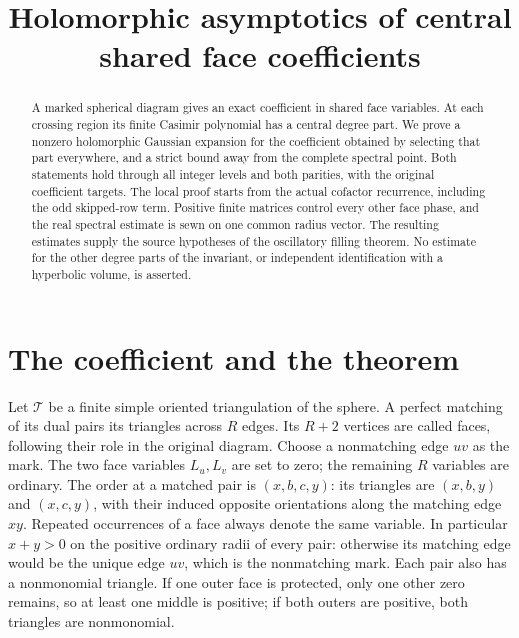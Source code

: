 \documentclass[11pt]{article}
\title{Holomorphic asymptotics of central shared face coefficients}
\author{}\date{}
\numberwithin{equation}{section}
\theoremstyle{definition}\newtheorem{definition}[theorem]{Definition}
\theoremstyle{remark}\newtheorem{remark}[theorem]{Remark}
\begin{document}
\maketitle
\begin{abstract}
A marked spherical diagram gives an exact coefficient in shared face
variables. At each crossing region its finite Casimir polynomial has a
central degree part. We prove a nonzero holomorphic Gaussian expansion
for the coefficient obtained by selecting that part everywhere, and a
strict bound away from the complete spectral point. Both statements
hold through all integer levels and both parities, with the original
coefficient targets. The local proof starts from the actual cofactor
recurrence, including the odd skipped-row term. Positive finite matrices
control every other face phase, and the real spectral estimate is sewn
on one common radius vector. The resulting estimates supply the source
hypotheses of the oscillatory filling theorem. No estimate for the other
degree parts of the invariant, or independent identification with a
hyperbolic volume, is asserted.
\end{abstract}

\section{The coefficient and the theorem}
Let $\mathcal T$ be a finite simple oriented triangulation of the sphere.
A perfect matching of its dual pairs its triangles across $R$ edges.
Its $R+2$ vertices are called faces, following their role in the original
diagram. Choose a nonmatching edge $uv$ as the mark. The two face
variables $L_u,L_v$ are set to zero; the remaining $R$ variables are
ordinary. The order at a matched pair is $(x,b,c,y)$: its triangles
are $(x,b,y)$ and $(x,c,y)$, with their induced opposite orientations
along the matching edge $xy$. Repeated occurrences of a face always
denote the same variable.
In particular $x+y>0$ on the positive ordinary radii of every pair:
otherwise its matching edge would be the unique edge $uv$, which is
the nonmatching mark. Each pair also has a nonmonomial triangle.
If one outer face is protected, only one other zero remains, so at
least one middle is positive; if both outers are positive, both
triangles are nonmonomial.
\end{document}
